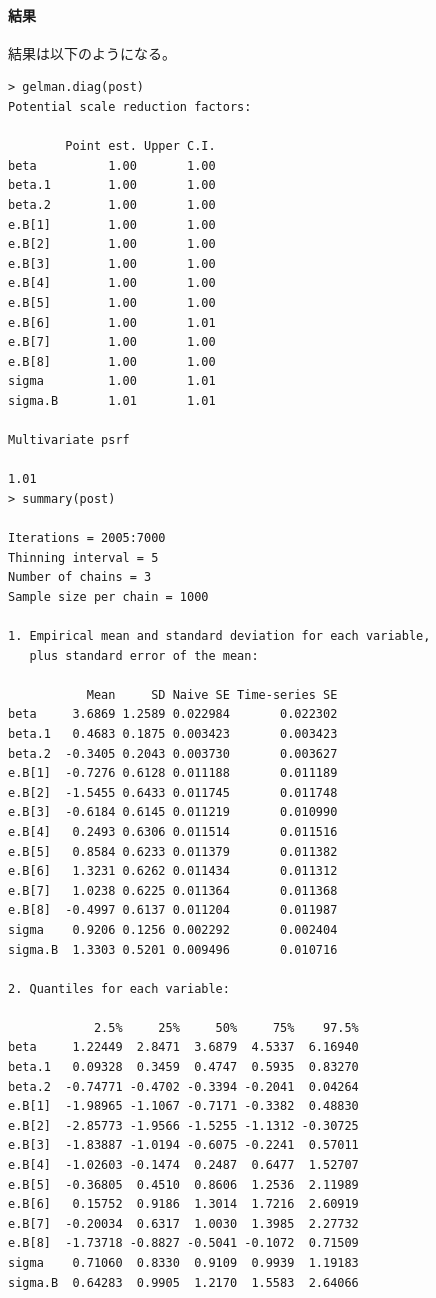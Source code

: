 \documentclass[11pt,uplatex]{jsarticle}
\begin{document}
\paragraph{結果}

結果は以下のようになる。
\vspace{1zw}
\begin{lstlisting}
> gelman.diag(post)
Potential scale reduction factors:

        Point est. Upper C.I.
beta          1.00       1.00
beta.1        1.00       1.00
beta.2        1.00       1.00
e.B[1]        1.00       1.00
e.B[2]        1.00       1.00
e.B[3]        1.00       1.00
e.B[4]        1.00       1.00
e.B[5]        1.00       1.00
e.B[6]        1.00       1.01
e.B[7]        1.00       1.00
e.B[8]        1.00       1.00
sigma         1.00       1.01
sigma.B       1.01       1.01

Multivariate psrf

1.01
> summary(post)

Iterations = 2005:7000
Thinning interval = 5 
Number of chains = 3 
Sample size per chain = 1000 

1. Empirical mean and standard deviation for each variable,
   plus standard error of the mean:

           Mean     SD Naive SE Time-series SE
beta     3.6869 1.2589 0.022984       0.022302
beta.1   0.4683 0.1875 0.003423       0.003423
beta.2  -0.3405 0.2043 0.003730       0.003627
e.B[1]  -0.7276 0.6128 0.011188       0.011189
e.B[2]  -1.5455 0.6433 0.011745       0.011748
e.B[3]  -0.6184 0.6145 0.011219       0.010990
e.B[4]   0.2493 0.6306 0.011514       0.011516
e.B[5]   0.8584 0.6233 0.011379       0.011382
e.B[6]   1.3231 0.6262 0.011434       0.011312
e.B[7]   1.0238 0.6225 0.011364       0.011368
e.B[8]  -0.4997 0.6137 0.011204       0.011987
sigma    0.9206 0.1256 0.002292       0.002404
sigma.B  1.3303 0.5201 0.009496       0.010716

2. Quantiles for each variable:

            2.5%     25%     50%     75%    97.5%
beta     1.22449  2.8471  3.6879  4.5337  6.16940
beta.1   0.09328  0.3459  0.4747  0.5935  0.83270
beta.2  -0.74771 -0.4702 -0.3394 -0.2041  0.04264
e.B[1]  -1.98965 -1.1067 -0.7171 -0.3382  0.48830
e.B[2]  -2.85773 -1.9566 -1.5255 -1.1312 -0.30725
e.B[3]  -1.83887 -1.0194 -0.6075 -0.2241  0.57011
e.B[4]  -1.02603 -0.1474  0.2487  0.6477  1.52707
e.B[5]  -0.36805  0.4510  0.8606  1.2536  2.11989
e.B[6]   0.15752  0.9186  1.3014  1.7216  2.60919
e.B[7]  -0.20034  0.6317  1.0030  1.3985  2.27732
e.B[8]  -1.73718 -0.8827 -0.5041 -0.1072  0.71509
sigma    0.71060  0.8330  0.9109  0.9939  1.19183
sigma.B  0.64283  0.9905  1.2170  1.5583  2.64066

\end{lstlisting}
\end{document}
